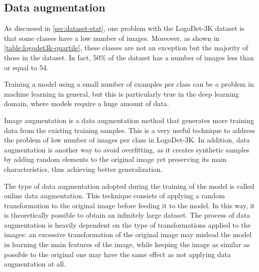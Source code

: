 \subsection{Data augmentation}
\label{sec:methods-augment}
As discussed in \autoref{sec:dataset-stat}, one problem with the LogoDet-3K dataset is that some classes have a low number of images. Moreover, as shown in \autoref{table:logodet3k-quartile}, these classes are not an exception but the majority of those in the dataset. In fact, 50\% of the dataset has a number of images less than or equal to 54.

Training a model using a small number of examples per class can be a problem in machine learning in general, but this is particularly true in the deep learning domain, where models require a huge amount of data.

Image augmentation is a data augmentation method that generates more training data from the existing training samples.
This is a very useful technique to address the problem of low number of images per class in LogoDet-3K.
In addition, data augmentation is another way to avoid overfitting, as it creates synthetic samples by adding random elements to the original image yet preserving its main characteristics, thus achieving better generalization.

The type of data augmentation adopted during the training of the model is called online data augmentation.
This technique consists of applying a random transformation to the original image before feeding it to the model.
In this way, it is theoretically possible to obtain an infinitely large dataset. The process of data augmentation is heavily dependent on the type of transformations applied to the images: an excessive transformation of the original image may mislead the model in learning the main features of the image, while keeping the image as similar as possible to the original one may have the same effect as not applying data augmentation at all.

